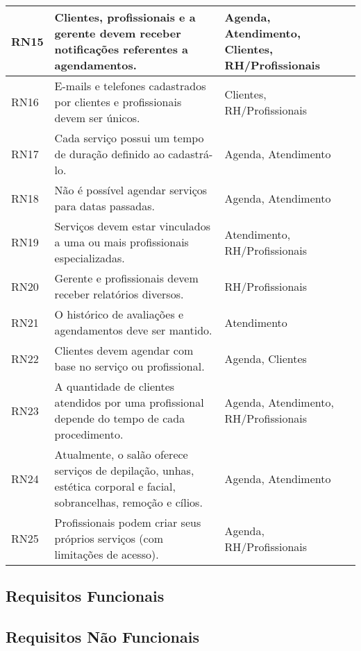 \begin{longtable}{|p{1.2cm}|p{10cm}|p{4cm}|}
	\hline
	RN15 & Clientes, profissionais e a gerente devem receber notificações referentes a agendamentos. & Agenda, Atendimento, Clientes, RH/Profissionais \\
	\hline
	RN16 & E-mails e telefones cadastrados por clientes e profissionais devem ser únicos. & Clientes, RH/Profissionais \\
	\hline
	RN17 & Cada serviço possui um tempo de duração definido ao cadastrá-lo. & Agenda, Atendimento \\
	\hline
	RN18 & Não é possível agendar serviços para datas passadas. & Agenda, Atendimento \\
	\hline
	RN19 & Serviços devem estar vinculados a uma ou mais profissionais especializadas. & Atendimento, RH/Profissionais \\
	\hline
	RN20 & Gerente e profissionais devem receber relatórios diversos. & RH/Profissionais \\
	\hline
	RN21 & O histórico de avaliações e agendamentos deve ser mantido. & Atendimento \\
	\hline
	RN22 & Clientes devem agendar com base no serviço ou profissional. & Agenda, Clientes \\
	\hline
	RN23 & A quantidade de clientes atendidos por uma profissional depende do tempo de cada procedimento. & Agenda, Atendimento, RH/Profissionais \\
	\hline
	RN24 & Atualmente, o salão oferece serviços de depilação, unhas, estética corporal e facial, sobrancelhas, remoção e cílios. & Agenda, Atendimento \\
	\hline
	RN25 & Profissionais podem criar seus próprios serviços (com limitações de acesso). & Agenda, RH/Profissionais \\
	\hline
	
\end{longtable}

\subsection{Requisitos Funcionais}
\subsection{Requisitos Não Funcionais}